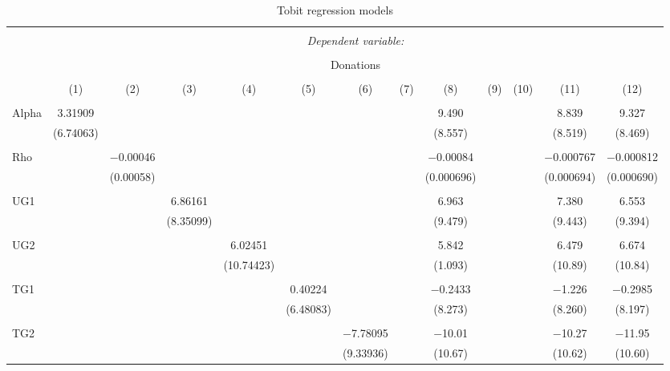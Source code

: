 \documentclass[12pt]{article}
\begin{document}
\begin{table}[!htbp] \centering 
  \caption{Tobit regression models} 
  \label{} 
            \begin{adjustbox}{width=\textwidth}
\begin{tabular}{@{\extracolsep{5pt}}lcccccccccccc} 
\\[-1.8ex]\hline 
\hline \\[-1.8ex] 
 & \multicolumn{12}{c}{\textit{Dependent variable:}} \\ 
\cline{2-13} 
\\[-1.8ex] & \multicolumn{12}{c}{Donations} \\ 
\\[-1.8ex] & (1) & (2) & (3) & (4) & (5) & (6) & (7) & (8) & (9) & (10) & (11) & (12) \\ 
\hline \\[-1.8ex] 
 Alpha & 3.31909 &  &  &  &  &  &  & 9.490  &  & & 8.839 & 9.327 \\ 
  & (6.74063) &  &  &  &  &  &  &  (8.557) & & & (8.519) & (8.469) \\ 
  & & & & & & & & & & & & \\ 
 Rho &  & $-$0.00046 &  &  &  &  &   & $-$0.00084 & &  & $-$0.000767 & $-$0.000812 \\ 
  &  & (0.00058) &  &  &  &  &  & (0.000696) &  &  & (0.000694) & (0.000690) \\ 
  & & & & & & & & & & & & \\  
 UG1 &  & & 6.86161 &  &  &  &  & 6.963 &  &  & 7.380 & 6.553 \\ 
  &  & & (8.35099) &  &  &  &  & (9.479) &  &  & (9.443) & (9.394) \\ 
  & & & & & & & & & & & & \\ 
 UG2 &  &  & & 6.02451 &  &  &  & 5.842 &  &  & 6.479 & 6.674 \\ 
  &  &  & & (10.74423) &  &  &  & (1.093) &  &  & (10.89) & (10.84) \\ 
  & & & & & & & & & & & & \\ 
 TG1 &  &  &  & & 0.40224 &  &  & $-$0.2433 &  &  & $-$1.226 & $-$0.2985 \\ 
  &  &  &  & & (6.48083) &  &   & (8.273)  &  &  & (8.260) & (8.197) \\ 
  & & & & & & & & & & & &\\ 
 TG2 &  &  &  &  & & $-$7.78095 &   & $-$10.01 &  &  & $-$10.27 & $-$11.95 \\ 
  &  &  &  &  & & (9.33936) &   & (10.67) &  &  & (10.62) & (10.60) \\ 

\end{tabular}
\end{adjustbox}
\end{table}
\end{document}
